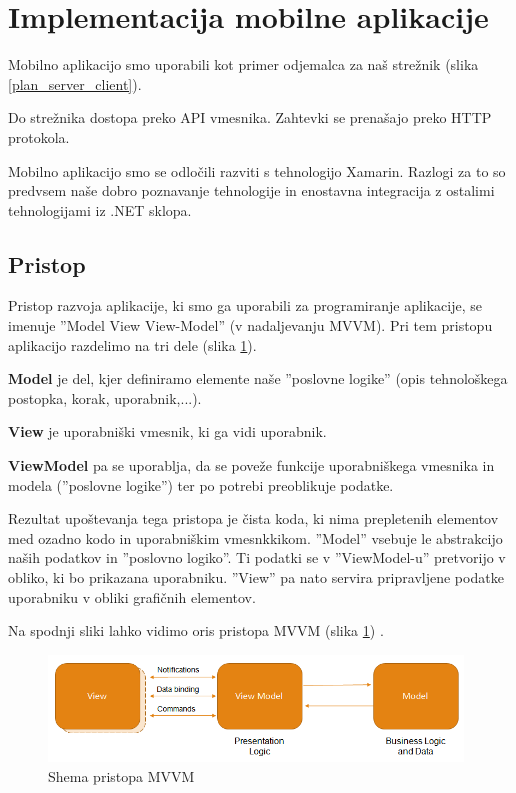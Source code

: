 \documentclass[a4paper, 12pt]{book}
\begin{document}
\section{Implementacija mobilne aplikacije}

Mobilno aplikacijo smo uporabili kot primer odjemalca za naš strežnik (slika \ref{plan_server_client}).

Do strežnika dostopa preko API vmesnika.
Zahtevki se prenašajo preko HTTP protokola.

Mobilno aplikacijo smo se odločili razviti s tehnologijo Xamarin.
Razlogi za to so predvsem naše dobro poznavanje tehnologije in enostavna integracija z ostalimi tehnologijami iz .NET sklopa.


\subsection{Pristop}
Pristop razvoja aplikacije, ki smo ga uporabili za programiranje aplikacije, se imenuje ''Model View View-Model'' (v nadaljevanju MVVM).
Pri tem pristopu aplikacijo razdelimo na tri dele (slika \ref{mvvm}).

\textbf{Model} je del, kjer definiramo elemente naše ''poslovne logike'' (opis tehnološkega postopka, korak, uporabnik,...).

\textbf{View} je uporabniški vmesnik, ki ga vidi uporabnik.

\textbf{ViewModel} pa se uporablja, da se poveže funkcije uporabniškega vmesnika in modela (''poslovne logike'') ter po potrebi preoblikuje podatke.

Rezultat upoštevanja tega pristopa je čista koda, ki nima prepletenih elementov med ozadno kodo in uporabniškim vmesnkkikom.
''Model'' vsebuje le abstrakcijo naših podatkov in ''poslovno logiko''.
Ti podatki se v ''ViewModel-u'' pretvorijo v obliko, ki bo prikazana uporabniku.
''View'' pa nato servira pripravljene podatke uporabniku v obliki grafičnih elementov.

Na spodnji sliki lahko vidimo oris pristopa MVVM (slika \ref{mvvm}) \cite{mvvmimage}.

\begin{figure}[H]
\begin{center}
\includegraphics[width=11cm]{mvvm}
\end{center}
	\caption{Shema pristopa MVVM}
\label{mvvm}
\end{figure}
\end{document}
